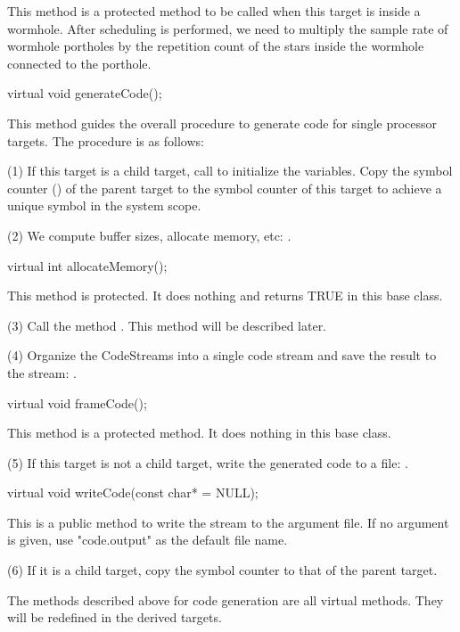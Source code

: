 This method is a protected method to be called when this target is
inside a wormhole. After scheduling is performed, we need to multiply
the sample rate of wormhole portholes by the repetition
count of the stars inside the wormhole connected to the porthole.

\begin{example}
virtual void generateCode();
\end{example}

This method guides the overall procedure to generate code for single
processor targets. The procedure is as follows:

(1) If this target is a child target, call  to initialize the
variables. Copy the symbol counter () of the parent
target to the symbol counter of this target to achieve a unique symbol
in the system scope.

(2) We compute buffer sizes, allocate memory, etc: .

\begin{example}
virtual int allocateMemory();
\end{example}

This method is protected. It does nothing and returns TRUE in this
base class.

(3) Call the method .  This method will be
described later.

(4) Organize the CodeStreams into a single code stream and save the result
to the  stream: .

\begin{example}
virtual void frameCode();
\end{example}

This method is a protected method. It does nothing in this base
class.

(5) If this target is not a child target, write the generated code
to a file: .

\begin{example}
virtual void writeCode(const char*  = NULL);
\end{example}

This is a public method to write the  stream to the argument
file. If no argument is given, use "code.output" as the default file
name.

(6) If it is a child target, copy the symbol counter to that of
the parent target.

The methods described above for code generation are all virtual
methods.  They will be redefined in the derived targets.

